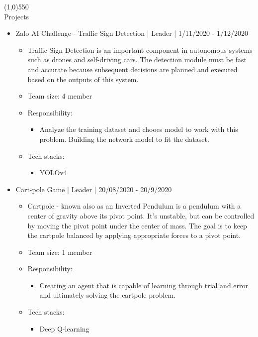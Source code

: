 \documentclass[a4paper, 12pt]{article}
\begin{document}
\line(1,0){550}\\
\vspace{3mm}
{\huge Projects}
\begin{itemize}
    \item Zalo AI Challenge - Traffic Sign Detection | Leader | 1/11/2020 - 1/12/2020
      \begin{itemize}
        \item Traffic Sign Detection is an important component in autonomous systems such as drones and self-driving cars. The detection module must be fast and accurate because subsequent decisions are planned and executed based on the outputs of this system.
          \item Team size: 4 member
          \item Responsibility:
            \begin{itemize}
                \item Analyze the training dataset and chooes model to work with this problem. Building the network model to fit the dataset.
            \end{itemize}
          \item Tech stacks:
            \begin{itemize}
                \item YOLOv4
            \end{itemize}
      \end{itemize}
    \item Cart-pole Game | Leader | 20/08/2020 - 20/9/2020
      \begin{itemize}
          \item Cartpole - known also as an Inverted Pendulum is a pendulum with a center of gravity above its pivot point. It’s unstable, but can be controlled by moving the pivot point under the center of mass. The goal is to keep the cartpole balanced by applying appropriate forces to a pivot point.
          \item Team size: 1 member
          \item Responsibility:
            \begin{itemize}
                \item Creating an agent that is capable of learning through trial and error and ultimately solving the cartpole problem.
            \end{itemize}
          \item Tech stacks:
            \begin{itemize}
                \item Deep Q-learning

\end{itemize}
\end{itemize}
\end{itemize}
\end{document}
